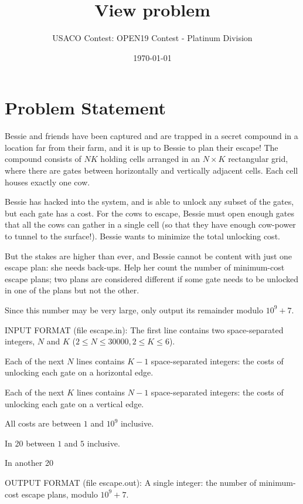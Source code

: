 \documentclass[12pt]{article}
\title{View problem}
\author{USACO Contest: OPEN19 Contest - Platinum Division}
\date{\today}
\begin{document}
\maketitle

\section*{Problem Statement}

Bessie and friends have been captured and are trapped in a secret compound in a
location far from their farm, and it is up to Bessie to plan their escape! The
compound consists of $NK$ holding cells arranged in an $N \times K$  rectangular
grid, where there are gates between horizontally and vertically adjacent cells.
Each cell houses exactly one cow. 

Bessie has hacked into the system, and is able to unlock any subset of the
gates, but each gate has a cost. For the cows to escape, Bessie must open enough
gates that all the cows can gather in a single cell (so that they have enough
cow-power to tunnel to the surface!). Bessie wants to minimize the total
unlocking cost.

But the stakes are higher than ever, and Bessie cannot be content with just one
escape plan: she needs back-ups. Help her count the number of minimum-cost
escape plans; two plans are considered different if some gate needs to be
unlocked in one of the plans but not the other.

Since this number may be very large, only output its remainder modulo
$10^9 + 7$.

INPUT FORMAT (file escape.in):
The first line contains two space-separated integers, $N$ and $K$
($2 \le N \le 30000, 2 \le K \le 6$).

Each of the next $N$ lines contains $K-1$ space-separated integers: the costs of
unlocking each gate on a horizontal edge.

Each of the next $K$ lines contains $N-1$ space-separated integers: the costs of
unlocking each gate on a vertical edge. 

All costs are between $1$ and $10^9$ inclusive.

In 20%
between $1$ and $5$ inclusive.

In another 20%


OUTPUT FORMAT (file escape.out):
A single integer: the number of minimum-cost escape plans, modulo $10^{9} + 7$. 
\end{document}
